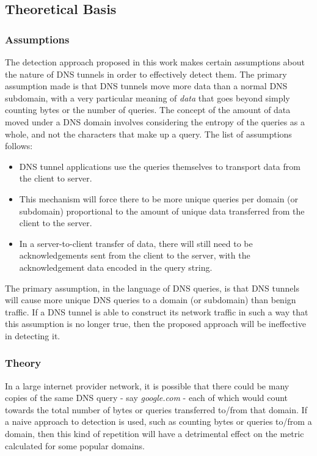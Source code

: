 \documentclass{llncs}
\begin{document}
\subsection{Theoretical Basis}
\subsubsection{Assumptions}
The detection approach proposed in this work
makes certain assumptions about the nature of DNS tunnels in order to
effectively detect them. The primary assumption made is that DNS tunnels move
more data than a normal DNS subdomain, with a very particular meaning of
\emph{data} that goes beyond simply counting bytes or the number of queries. The
concept of the amount of data moved under a DNS domain involves considering the
entropy of the queries as a whole, and not the characters that make up a query.
The list of assumptions follows:

\begin{itemize}
\item DNS tunnel applications use the queries themselves to transport data from
the client to server.
\item This mechanism will force there to be more unique
queries per domain (or subdomain) proportional to the amount of unique data transferred
from the client to the server.
\item In a server-to-client transfer of data, there will still need to be
acknowledgements sent from the client to the server, with the acknowledgement
data encoded in the query string.
\end{itemize}

The primary assumption, in the language of DNS queries, is that DNS tunnels will
cause more unique DNS queries to a domain (or subdomain) than benign traffic. If
a DNS tunnel is able to construct its network traffic in such a way that this
assumption is no longer true, then the proposed approach will be ineffective in
detecting it.

\subsubsection{Theory}
In a large internet provider network, it is possible that there could be many
copies of the same DNS query - say \emph{google.com} - each of which would count
towards the total number of bytes or queries transferred to/from that domain. If a naive
approach to detection is used, such as counting bytes or queries to/from a
domain, then this kind of repetition will have a detrimental effect on the
metric calculated for some popular domains.
\end{document}
